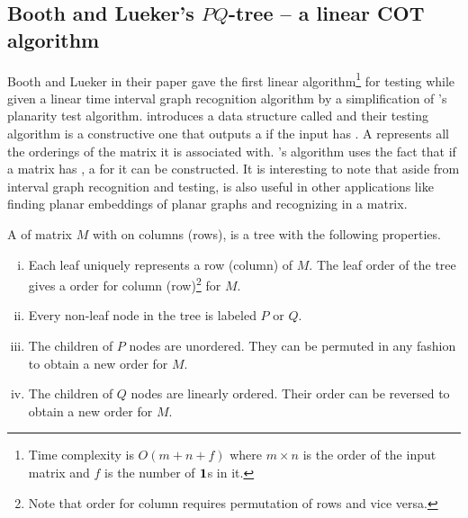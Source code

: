 \subsection{Booth and Lueker's $PQ$-tree -- a linear COT algorithm} %

Booth and Lueker in their paper \cite{bl76} gave the first linear
algorithm\footnote{Time complexity is $O\left(m+n+f\right)$ where $m
  \times n$ is the order of the input matrix and $f$ is the number of
  $\textbf{1}$s in it.} for \cop testing while given a linear time interval
graph recognition algorithm by a simplification of 's planarity test algorithm.
%
\cite{bl76} introduces a data structure called \PQtree and their \COP
testing algorithm is a constructive one that outputs a \PQtree if the
input has \COP. A \PQtree represents all the \COP orderings of the
matrix it is associated with. \cite{bl76}'s algorithm uses the fact
that if a matrix has \COP, a \PQtree for it can be constructed. It is
interesting to note that aside from interval graph recognition and
\COP testing, \PQtree is also useful in other applications like
finding planar embeddings of planar graphs \cite{lec67,mcc04} and
recognizing \CROP in a matrix.

\begin{definition}
  A \PQtree of matrix $M$ with \COP on columns (rows), is a tree with
  the following properties.
  \begin{enumerate}[i.]
    \singlespacing
  \item Each leaf uniquely represents a row (column) of $M$. The leaf
    order of the tree gives a \COP order for column (row)\footnote{Note
      that \COP order for column requires permutation of rows and vice
      versa.} for $M$.
  \item Every non-leaf node in the tree is labeled $P$ or $Q$.
  \item \label{def::nodep} The children of $P$ nodes are
    unordered. They can be permuted in any fashion to obtain a new
    \COP order for $M$.
  \item \label{def::nodeq} The children of $Q$ nodes are linearly
    ordered. Their order can be reversed to obtain a new \COP
    order for $M$.
  \end{enumerate}
  \label{def:pqtree}
\end{definition}

